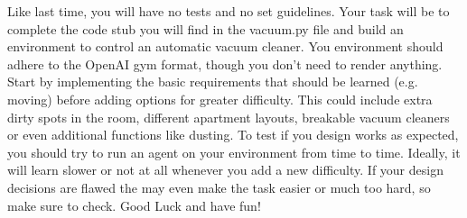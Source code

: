 \documentclass{exam}
\begin{document}
\noindent Like last time, you will have no tests and no set guidelines. Your task will be to complete the code stub you will find in the vacuum.py file and build an environment to control an automatic vacuum cleaner.
You environment should adhere to the OpenAI gym format, though you don't need to render anything. Start by implementing the basic requirements that should be learned (e.g. moving) before adding options for greater difficulty. This could include extra dirty spots in the room, different apartment layouts, breakable vacuum cleaners or even additional functions like dusting.
To test if you design works as expected, you should try to run an agent on your environment from time to time. 
Ideally, it will learn slower or not at all whenever you add a new difficulty. If your design decisions are flawed the may even make the task easier or much too hard, so make sure to check. Good Luck and have fun!
\end{document}
